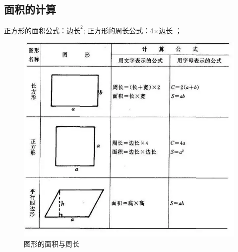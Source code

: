 \documentclass{article}
\theoremstyle{definition}
\theoremstyle{remark}
\theoremstyle{theorem}
\begin{document}
\subsection{面积的计算}
正方形的面积公式：$\textbf{边长}^{2}$;
正方形的周长公式：4$\times\textbf{边长 }$；
\begin{figure}
    \centering
    \includegraphics[scale=0.5]{area.png}
    \caption{图形的面积与周长}
    \label{fig:my_label}
\end{figure}
\end{document}
